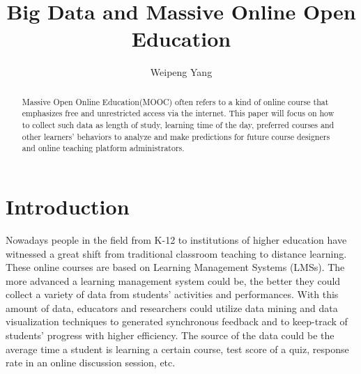 \documentclass[sigconf]{acmart}
\begin{document}
\title{Big Data and Massive Online Open Education}

\author{Weipeng Yang}



\begin{abstract}
Massive Open Online Education(MOOC) often refers to a kind of online course that emphasizes free and unrestricted access via the internet. This paper will focus on how to collect such data as length of study, learning time of the day, preferred courses and other learners' behaviors to analyze and make predictions for future course designers and online teaching platform administrators.
\end{abstract}


\maketitle

\section{Introduction}

Nowadays people in the field from K-12 to institutions of higher education have witnessed a great shift from traditional classroom teaching to distance learning. These online courses are based on Learning Management Systems (LMSs). The more advanced a learning management system could be, the better they could collect a variety of data from students’ activities and performances. \cite{Cormier2010} With this amount of data, educators and researchers could utilize data mining and data visualization techniques to generated synchronous feedback and to keep-track of students’ progress with higher efficiency. The source of the data could be the average time a student is learning a certain course, test score of a quiz, response rate in an online discussion session, etc. \cite{Klobas2010}
\end{document}
